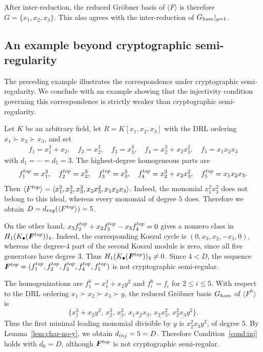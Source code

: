 \documentclass{article}
\theoremstyle{definition}
\theoremstyle{plain}
\theoremstyle{plain}
\theoremstyle{plain}
\theoremstyle{plain}
\numberwithin{equation}{subsection}
\begin{document}
\medskip

After inter-reduction, the reduced Gr\"obner basis of $\langle F\rangle$ is therefore $G=\{x_1,x_2,x_3\}$.
This also agrees with the inter-reduction of $G_{\rm hom}|_{y=1}$.

\subsection{An example beyond cryptographic semi-regularity}\label{app:example-noncsr}

The preceding example illustrates the correspondence under cryptographic semi-regularity.
We conclude with an example showing that the injectivity condition governing this correspondence is strictly weaker than cryptographic semi-regularity.

Let $K$ be an arbitrary field, let $R=K[x_1,x_2,x_3]$ with the DRL ordering $x_1\succ x_2\succ x_3$, and set
\begin{eqnarray*}
f_1=x_1^3+x_2,\quad f_2=x_2^3,\quad f_3=x_3^3,\quad f_4=x_2^3+x_2x_3^2,\quad f_5=x_1x_2x_3
\end{eqnarray*}
with $d_1=\cdots=d_5=3$.
The highest-degree homogeneous parts are
\[
f_1^{\rm top}=x_1^3,\quad f_2^{\rm top}=x_2^3,\quad f_3^{\rm top}=x_3^3,\quad f_4^{\rm top}=x_2^3+x_2x_3^2,\quad f_5^{\rm top}=x_1x_2x_3.
\]
Then $\langle F^{\rm top}\rangle = \langle x_1^3,x_2^3,x_3^3,x_2x_3^2,x_1x_2x_3 \rangle$.
Indeed, the monomial $x_1^2x_3^2$ does not belong to this ideal, whereas every monomial of degree $5$ does.
Therefore we obtain $D=d_{\rm reg}(\langle F^{\rm top}\rangle)=5$.

On the other hand, $x_3f_2^{\rm top}+x_2f_3^{\rm top}-x_3f_4^{\rm top}=0$ gives a nonzero class in $H_1(K_\bullet(\bm F^{\rm top}))_4$.
Indeed, the corresponding Koszul cycle is $(0,x_3,x_2,-x_3,0)$, whereas the degree-$4$ part of the second Koszul module is zero, since all five generators have degree $3$.
Thus $H_1(K_\bullet(\bm F^{\rm top}))_4\neq0$.
Since $4<D$, the sequence $\bm F^{\rm top}=(f_1^{\rm top},f_2^{\rm top},f_3^{\rm top}, f_4^{\rm top}, f_5^{\rm top})$ is not cryptographic semi-regular.

The homogenizations are $f_1^h=x_1^3+x_2y^2$ and $f_i^h=f_i$ for $2\leq i\leq5$.
With respect to the DRL ordering $x_1\succ x_2\succ x_3\succ y$, the reduced Gr\"obner basis $G_{\rm hom}$ of $\langle F^h\rangle$ is
\[
\{
\underline{x_1^3}+x_2y^2,\,
\underline{x_2^3},\,
\underline{x_3^3},\,
\underline{x_1x_2x_3},\,
\underline{x_2x_3^2},\,
\underline{x_2^2x_3y^2}
\}.
\]
Thus the first minimal leading monomial divisible by $y$ is
$x_2^2x_3y^2$, of degree $5$.
By Lemma~\ref{lem:char-no-y}, we obtain $d_{\rm inj}=5=D$.
Therefore Condition~\ref{cond:inj} holds with $d_0=D$, although
$\bm F^{\rm top}$ is not cryptographic semi-regular.
\end{document}
